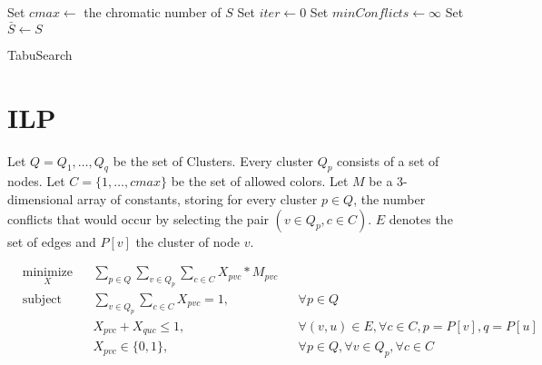 \documentclass{article}
\begin{document}
\begin{algorithm}
Set $cmax \gets$ the chromatic number of $S$\;
Set $iter \gets 0$\;
Set $minConflicts \gets \infty$\;
Set $\bar{S} \gets S$\;

\;
\caption{{\sc TabuSearch}}
\label{algo:tabusearch}
\end{algorithm}

\section{ILP}

Let $Q = {Q_1,\ldots,Q_q}$ be the set of Clusters. Every cluster $Q_p$ consists of a set of nodes. Let $C=\{1,\ldots,cmax\}$ be the
set of allowed colors. Let $M$ be a 3-dimensional array of constants, storing
for every cluster $p \in Q$, the number conflicts that would occur by selecting the pair $(v \in Q_p, c \in C)$.
$E$ denotes the set of edges and $P[v]$ the cluster of node $v$.

\begin{equation*}
\begin{aligned}
& \underset{X}{\text{minimize}}
& & \sum_{p \in Q}\sum_{v \in Q_p}\sum_{c \in C} X_{pvc} * M_{pvc} \\
& \text{subject to}
& & \sum_{v \in Q_p}\sum_{c \in C} X_{pvc}=1, && \forall p \in Q\\
&&& X_{pvc}+X_{quc} \leq 1, && \forall (v,u) \in E, \forall c \in C, p=P[v], q=P[u]\\
&&& X_{pvc} \in \{0,1\}, && \forall p \in Q, \forall v \in Q_p, \forall c \in C
\end{aligned}
\end{equation*}
\end{document}

